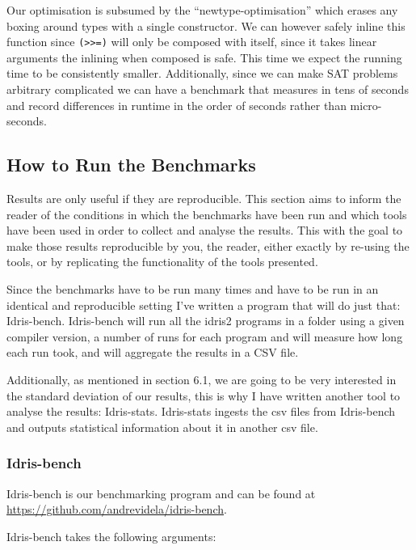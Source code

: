 \documentclass[
]{article}
\begin{document}
Our optimisation is subsumed by the ``newtype-optimisation'' which
erases any boxing around types with a single constructor. We can however
safely inline this function since
\texttt{(\textgreater{}\textgreater{}=)} will only be composed with
itself, since it takes linear arguments the inlining when composed is
safe. This time we expect the running time to be consistently smaller.
Additionally, since we can make SAT problems arbitrary complicated we
can have a benchmark that measures in tens of seconds and record
differences in runtime in the order of seconds rather than
micro-seconds.

\hypertarget{how-to-run-the-benchmarks}{%
\subsection{How to Run the Benchmarks}\label{how-to-run-the-benchmarks}}

Results are only useful if they are reproducible. This section aims to
inform the reader of the conditions in which the benchmarks have been
run and which tools have been used in order to collect and analyse the
results. This with the goal to make those results reproducible by you,
the reader, either exactly by re-using the tools, or by replicating the
functionality of the tools presented.

Since the benchmarks have to be run many times and have to be run in an
identical and reproducible setting I've written a program that will do
just that: Idris-bench. Idris-bench will run all the idris2 programs in
a folder using a given compiler version, a number of runs for each
program and will measure how long each run took, and will aggregate the
results in a CSV file.

Additionally, as mentioned in section 6.1, we are going to be very
interested in the standard deviation of our results, this is why I have
written another tool to analyse the results: Idris-stats. Idris-stats
ingests the csv files from Idris-bench and outputs statistical
information about it in another csv file.

\hypertarget{idris-bench}{%
\subsubsection{Idris-bench}\label{idris-bench}}

Idris-bench is our benchmarking program and can be found at
\url{https://github.com/andrevidela/idris-bench}.

Idris-bench takes the following arguments:
\end{document}
